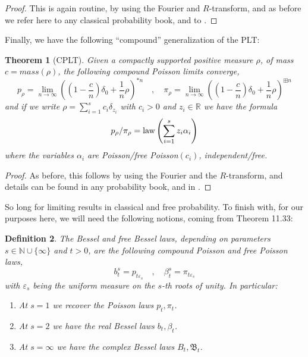 \documentclass[12pt]{amsbook}
\newtheorem{theorem}{Theorem}[chapter]
\newtheorem{definition}[theorem]{Definition}
\begin{document}
\begin{proof}
This is again routine, by using the Fourier and $R$-transform, and as before we refer here to any classical probability book, and to \cite{vdn}.
\end{proof}

Finally, we have the following ``compound'' generalization of the PLT:

\begin{theorem}[CPLT]
Given a compactly supported positive measure $\rho$, of mass $c=mass(\rho)$, the following compound Poisson limits converge,
$$p_\rho=\lim_{n\to\infty}\left(\left(1-\frac{c}{n}\right)\delta_0+\frac{1}{n}\rho\right)^{*n}
\quad,\quad 
\pi_\rho=\lim_{n\to\infty}\left(\left(1-\frac{c}{n}\right)\delta_0+\frac{1}{n}\rho\right)^{\boxplus n}$$
and if we write $\rho=\sum_{i=1}^sc_i\delta_{z_i}$ with $c_i>0$ and $z_i\in\mathbb R$ we have the formula
$$p_\rho/\pi_\rho={\rm law}\left(\sum_{i=1}^sz_i\alpha_i\right)$$
where the variables $\alpha_i$ are Poisson/free Poisson$(c_i)$, independent/free.
\end{theorem}

\begin{proof}
As before, this follows by using the Fourier and the $R$-transform, and details can be found in any probability book, and in \cite{vdn}.
\end{proof}

So long for limiting results in classical and free probability. To finish with, for our purposes here, we will need the following notions, coming from Theorem 11.33:

\begin{definition}
The Bessel and free Bessel laws, depending on parameters $s\in\mathbb N\cup\{\infty\}$ and $t>0$, are the following compound Poisson and free Poisson laws,
$$b^s_t=p_{t\varepsilon_s}\quad,\quad 
\beta^s_t=\pi_{t\varepsilon_s}$$
with $\varepsilon_s$ being the uniform measure on the $s$-th roots of unity. In particular:
\begin{enumerate}
\item At $s=1$ we recover the Poisson laws $p_t,\pi_t$.

\item At $s=2$ we have the real Bessel laws $b_t,\beta_t$.

\item At $s=\infty$ we have the complex Bessel laws $B_t,\mathfrak B_t$.
\end{enumerate}
\end{definition}
\end{document}
